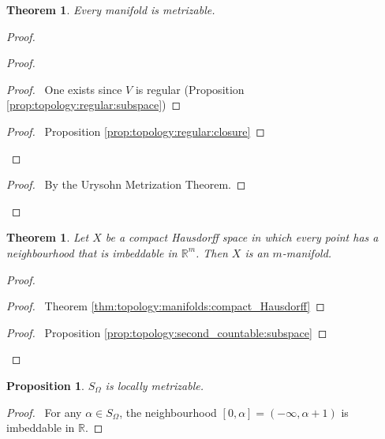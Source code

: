 \documentclass{report}
\let\qed\relax
\newtheorem{prop}[lm]{Proposition}
\newtheorem{thm}[lm]{Theorem}
\theoremstyle{definition}
\begin{document}
 \begin{thm}
  Every manifold is metrizable.
 \end{thm}

 \begin{proof}
  \pf
  \begin{proof}
    \begin{proof}
      \pf\ One exists since $V$ is regular (Proposition
      \ref{prop:topology:regular:subspace})
    \end{proof}
    \qedstep
    \begin{proof}
      \pf\ Proposition \ref{prop:topology:regular:closure}
    \end{proof}
  \end{proof}
  \qedstep
  \begin{proof}
    \pf\ By the Urysohn Metrization Theorem.
  \end{proof}
  \qed
 \end{proof}

 \begin{thm}
  Let $X$ be a compact Hausdorff space in which every point has a neighbourhood
  that is imbeddable in $\mathbb{R}^m$. Then $X$ is an $m$-manifold.
 \end{thm}

 \begin{proof}
  \pf
  \begin{proof}
    \pf\ Theorem \ref{thm:topology:manifolds:compact_Hausdorff}
  \end{proof}
  \begin{proof}
    \pf\ Proposition \ref{prop:topology:second_countable:subspace}
  \end{proof}
  \qed
 \end{proof}

 \begin{prop}
  $S_\Omega$ is locally metrizable.
 \end{prop}

 \begin{proof}
  \pf\ For any $\alpha \in S_\Omega$, the neighbourhood $[0, \alpha] = (-
  \infty, \alpha + 1)$ is imbeddable in $\mathbb{R}$. \qed
 \end{proof}
\end{document}
